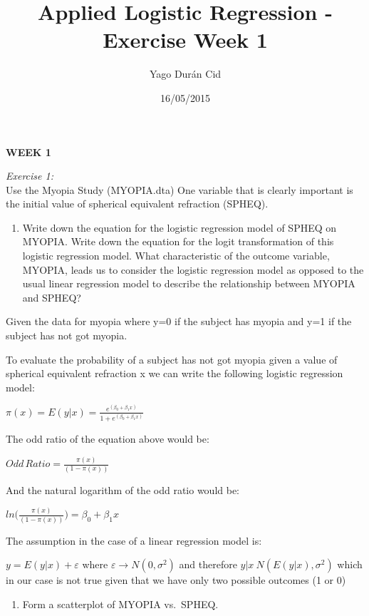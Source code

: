 \documentclass[]{article}
\title{Applied Logistic Regression - Exercise Week 1}
\author{Yago Durán Cid}
\date{16/05/2015}
\begin{document}
\maketitle


\textbf{WEEK 1}

\emph{Exercise 1:}\\Use the Myopia Study (MYOPIA.dta) One variable that
is clearly important is the initial value of spherical equivalent
refraction (SPHEQ).

\begin{enumerate}
\def\labelenumi{\alph{enumi}.}
\itemsep1pt\parskip0pt
\item
  Write down the equation for the logistic regression model of SPHEQ on
  MYOPIA. Write down the equation for the logit transformation of this
  logistic regression model. What characteristic of the outcome
  variable, MYOPIA, leads us to consider the logistic regression model
  as opposed to the usual linear regression model to describe the
  relationship between MYOPIA and SPHEQ?
\end{enumerate}

Given the data for myopia where y=0 if the subject has myopia and y=1 if
the subject has not got myopia.

To evaluate the probability of a subject has not got myopia given a
value of spherical equivalent refraction x we can write the following
logistic regression model:

$\pi(x)=E(y|x)=\frac{e^{(\beta_0+\beta_1x)}}{1+e^{(\beta_0+\beta_1x)}}$

The odd ratio of the equation above would be:

$Odd\,Ratio=\frac{\pi(x)}{(1-\pi(x))}$

And the natural logarithm of the odd ratio would be:

$ln\bigg(\frac{\pi(x)}{(1-\pi(x))}\bigg)=\beta_0+\beta_1x$

The assumption in the case of a linear regression model is:

$y=E(y|x)+\varepsilon$ where $\varepsilon \rightarrow N(0,\sigma^2)$ and
therefore $y|x~N(E(y|x),\sigma^2)$ which in our case is not true given
that we have only two possible outcomes (1 or 0)

\begin{enumerate}
\def\labelenumi{\alph{enumi}.}
\setcounter{enumi}{1}
\itemsep1pt\parskip0pt
\item
  Form a scatterplot of MYOPIA vs.~SPHEQ.
\end{enumerate}
\end{document}

